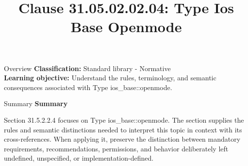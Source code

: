 \documentclass[10pt,letterpaper]{article}
\title{Clause 31.05.02.02.04: Type Ios Base Openmode}
\author{}
\date{}
\begin{document}
\maketitle
\begin{CornellOverviewBox}{Overview}
\textbf{Classification:} Standard library - Normative\\[2pt]
\textbf{Learning objective:} Understand the rules, terminology, and semantic consequences associated with Type ios\_base::openmode.
\end{CornellOverviewBox}\begin{CornellSummaryBox}{Summary}
{\sffamily\bfseries\color{Accent} Summary}\par\vspace{3pt}Section 31.5.2.2.4 focuses on Type ios\_base::openmode. The section supplies the rules and semantic distinctions needed to interpret this topic in context with its cross-references. When applying it, preserve the distinction between mandatory requirements, recommendations, permissions, and behavior deliberately left undefined, unspecified, or implementation-defined.
\end{CornellSummaryBox}
\end{document}
